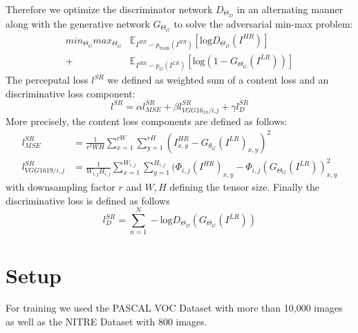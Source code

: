 \documentclass[10pt,twocolumn,letterpaper]{article}
\begin{document}
Therefore we optimize the discriminator network $D_{\Theta_D}$ in an
alternating manner along with the generative network $G_{\Theta_G}$ to
solve the adversarial min-max problem:
\begin{align*}
  min_{\Theta_G} max_{\Theta_G} &\mathbb{E}_{I^{HR} \backsim p_{\text{train}}(I^{HR})} [\text{log} D_{\Theta_D}(I^{HR})] \\
  +&\mathbb{E}_{I^{HR} \backsim p_G(I^{LR})} [\text{log} (1-G_{\Theta_G}(I^{LR}))]
\end{align*}
The perceputal loss $l^{SR}$ we defined as weighted sum of a content loss and an discriminative loss component:
\begin{equation*}
  l^{SR}=\alpha l^{SR}_{MSE} + \beta l^{SR}_{VGG16_19/i.j} + \gamma l^{SR}_{D}
\end{equation*}
More precisely, the content loss components are defined as follows:
\begin{align*}
  l^{SR}_{M SE}       &= \frac{1}{r^2WH}\sum_{x=1}^{rW}\sum_{y=1}^{rH}(I^{HR}_{x,y}-G_{\theta_G}(I^{LR})_{x,y})^2 \\
  l^{SR}_{VGG1619/i,j}&=\frac{1}{W_{i,j}H_{i,j}} \sum_{x=1}^{W_{i,j}}\sum_{y=1}^{H_{i,j}}(\Phi_{i,j}(I^{HR})_{x,y}-\Phi_{i,j}(G_{\Theta_G}(I^{LR}))_{x,y}^2
\end{align*}
with downsampling factor $r$ and $W,H$ defining the tensor size.
Finally the discriminative loss is defined as follows
\begin{equation*}  
  l^{SR}_{D}=\sum_{n=1}^N -\text{log}D_{\Theta_D}(G_{\Theta_G}(I^{LR}))
\end{equation*}
\section{Setup}
\label{sec:setup}



For training we used the PASCAL VOC Dataset\cite{pascal-voc-2012} with
more than 10,000 images as well as the NITRE
Dataset\cite{Agustsson_2017_CVPR_Workshops} with 800 images.

\end{document}
